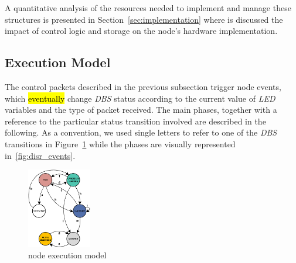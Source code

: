 A quantitative analysis of the resources needed to implement and
manage these structures is presented in Section~\ref{sec:implementation} where is discussed 
the impact of \disr{} control logic and storage on the
node's hardware implementation.

\subsection{Execution Model}
\label{sub:phases}

The \disr{} control packets described in the previous subsection trigger
node events, which \hl{eventually} change \emph{DBS} status according to the
current value of \emph{LED} variables and the type of packet received.
The main \disr{} phases, together with a reference to the particular
status transition involved are described in the following. As a
convention, we used single letters to refer to one of the \emph{DBS} transitions in
Figure~\ref{fig:state_machine} while the phases are visually
represented in~\ref{fig:disr_events}.

\begin{figure}
  \centering
    \includegraphics[width=0.25\textwidth]{pictures/dbs_updated.eps}
  \caption{\disr{} node execution model}
  \label{fig:state_machine}
\end{figure}

